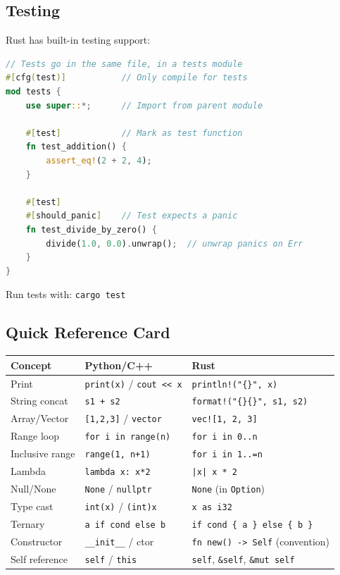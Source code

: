 \documentclass[11pt,a4paper]{article}
\begin{document}
\subsection{Testing}

Rust has built-in testing support:

\begin{lstlisting}[language=Rust]
// Tests go in the same file, in a tests module
#[cfg(test)]           // Only compile for tests
mod tests {
    use super::*;      // Import from parent module
    
    #[test]            // Mark as test function
    fn test_addition() {
        assert_eq!(2 + 2, 4);
    }
    
    #[test]
    #[should_panic]    // Test expects a panic
    fn test_divide_by_zero() {
        divide(1.0, 0.0).unwrap();  // unwrap panics on Err
    }
}
\end{lstlisting}

Run tests with: \texttt{cargo test}

\subsection{Quick Reference Card}

\begin{center}
\begin{tabular}{p{3.5cm}p{4cm}p{4.5cm}}
\toprule
\textbf{Concept} & \textbf{Python/C++} & \textbf{Rust} \\
\midrule
Print & \texttt{print(x)} / \texttt{cout << x} & \texttt{println!("\{\}", x)} \\
String concat & \texttt{s1 + s2} & \texttt{format!("\{\}\{\}", s1, s2)} \\
Array/Vector & \texttt{[1,2,3]} / \texttt{vector} & \texttt{vec![1, 2, 3]} \\
Range loop & \texttt{for i in range(n)} & \texttt{for i in 0..n} \\
Inclusive range & \texttt{range(1, n+1)} & \texttt{for i in 1..=n} \\
Lambda & \texttt{lambda x: x*2} & \texttt{|x| x * 2} \\
Null/None & \texttt{None} / \texttt{nullptr} & \texttt{None} (in \texttt{Option}) \\
Type cast & \texttt{int(x)} / \texttt{(int)x} & \texttt{x as i32} \\
Ternary & \texttt{a if cond else b} & \texttt{if cond \{ a \} else \{ b \}} \\
Constructor & \texttt{\_\_init\_\_} / ctor & \texttt{fn new() -> Self} (convention) \\
Self reference & \texttt{self} / \texttt{this} & \texttt{self}, \texttt{\&self}, \texttt{\&mut self} \\
\bottomrule
\end{tabular}
\end{center}
\end{document}
